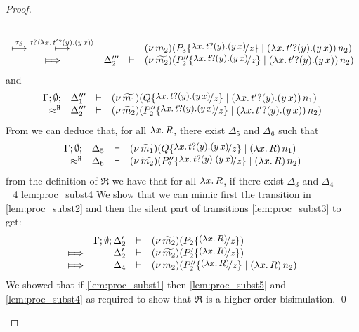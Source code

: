 \begin{proof}
\begin{enumerate}
\begin{itemize}
\begin{eqnarray}
\begin{array}{crll}
									\\
									{\hby{\btau}~\hby{\bactinp{t}{\trvalx{t'}}}} &
												&&	\newsp{m_2}{P_3 \subst{\trvalx{t}}{z} \Par \appl{(\trvalx{t'})}{n_2}}
									\\
									\Hby{}	& \Delta_2''' & \proves & \newsp{\widetilde{m_2}}{P_2'' \subst{\trvalx{t}}{z} \Par \appl{(\trvalx{t'})}{n_2}}
								\end{array}
								\label{lem:proc_subst3}
							\end{eqnarray}
							and
							\begin{eqnarray*}
								\mhorel{\Gamma}{\Delta_1'''}{\newsp{\widetilde{m_1}}{Q \subst{\trvalx{t}}{z} \Par \appl{(\trvalx{t'})}{n_1}}}
								{\hwb}
								{\Delta_2'''}{}{\newsp{\widetilde{m_2}}{P_2'' \subst{\trvalx{t}}{z} \Par \appl{(\trvalx{t'})}{n_2}}}
							\end{eqnarray*}
							From  we can deduce that, for all $\lambda x.\,R$, there exist $\Delta_5$ and $ \Delta_6$ such that
							\begin{eqnarray*}
								\mhorel{\Gamma}{\Delta_5}{\newsp{\widetilde{m_1}}{Q \subst{\trvalx{t}}{z} \Par \appl{(\abs{x}{R})}{n_1}}}
								{\hwb}
								{\Delta_6}{}{\newsp{\widetilde{m_2}}{P_2'' \subst{\trvalx{t}}{z} \Par \appl{(\abs{x}{R})}{n_2}}}
							\end{eqnarray*}
							from the definition of $\Re$ we have that for all $\lambda x.\,R$, if there exist $\Delta_3$ and $\Delta_4$
								{\ \Re\ }
								{\Delta_4}{}
								{lem:proc_subst4}
							We show that we can mimic first the
							transition in \eqref{lem:proc_subst2} and then the silent part of
							transitions \eqref{lem:proc_subst3} to get:
							\begin{eqnarray}
								\begin{array}{crll}
										& \Gamma; \es; \Delta_2' &\proves& \newsp{\widetilde{m_2}}{P_2 \subst{(\abs{x}{R})}{z}}
									\\
									\Hby{}	&	\Delta_2'			& \proves&	\newsp{\widetilde{m_2}}{P_2' \subst{(\abs{x}{R})}{z}}
									\\
									\Hby{} &	\Delta_4			& \proves&	\newsp{m_2}{P_2'' \subst{(\abs{x}{R})}{z} \Par \appl{(\abs{x}{R})}{n_2}}
								\end{array}
								\label{lem:proc_subst5}
							\end{eqnarray}
							We showed that if \eqref{lem:proc_subst1} then \eqref{lem:proc_subst5} and \eqref{lem:proc_subst4}
							as required to show that $\Re$ is a higher-order bisimulation.							\qed
				\end{itemize}
	\end{enumerate}
\end{proof}



